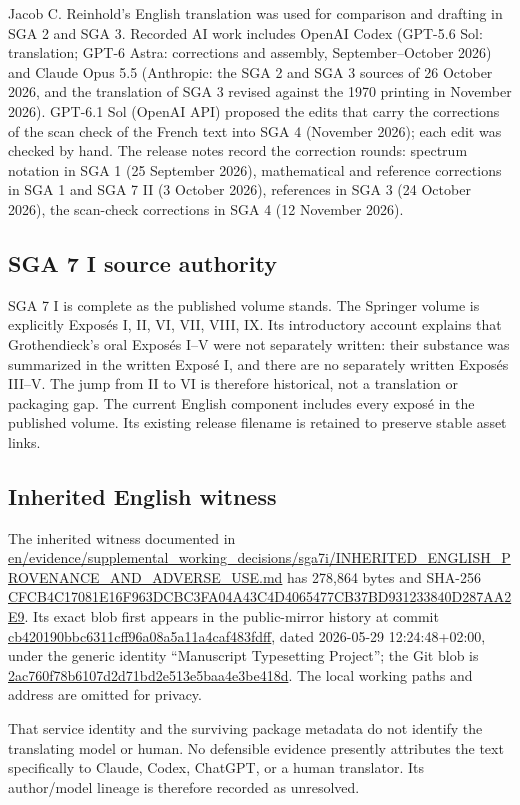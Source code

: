 Jacob C. Reinhold's English translation was used for comparison and drafting in SGA 2 and SGA 3. Recorded AI work includes OpenAI Codex (GPT-5.6 Sol: translation; GPT-6 Astra: corrections and assembly, September–October 2026) and Claude Opus 5.5 (Anthropic: the SGA 2 and SGA 3 sources of 26 October 2026, and the translation of SGA 3 revised against the 1970 printing in November 2026). GPT-6.1 Sol (OpenAI API) proposed the edits that carry the corrections of the scan check of the French text into SGA 4 (November 2026); each edit was checked by hand. The release notes record the correction rounds: spectrum notation in SGA 1 (25 September 2026), mathematical and reference corrections in SGA 1 and SGA 7 II (3 October 2026), references in SGA 3 (24 October 2026), the scan-check corrections in SGA 4 (12 November 2026).


\subsection*{SGA 7 I source authority}

SGA 7 I is complete as the published volume stands. The Springer volume is explicitly Exposés I, II, VI, VII, VIII, IX. Its introductory account explains that Grothendieck's oral Exposés I–V were not separately written: their substance was summarized in the written Exposé I, and there are no separately written Exposés III–V. The jump from II to VI is therefore historical, not a translation or packaging gap. The current English component includes every exposé in the published volume. Its existing release filename is retained to preserve stable asset links.


\subsection*{Inherited English witness}

The inherited witness documented in \url{en/evidence/supplemental_working_decisions/sga7i/INHERITED_ENGLISH_PROVENANCE_AND_ADVERSE_USE.md} has 278,864 bytes and SHA-256 \url{CFCB4C17081E16F963DCBC3FA04A43C4D4065477CB37BD931233840D287AA2E9}. Its exact blob first appears in the public-mirror history at commit \url{cb420190bbc6311cff96a08a5a11a4caf483fdff}, dated 2026-05-29 12:24:48+02:00, under the generic identity “Manuscript Typesetting Project”; the Git blob is \url{2ac760f78b6107d2d71bd2e513e5baa4e3be418d}. The local working paths and address are omitted for privacy.

That service identity and the surviving package metadata do not identify the translating model or human. No defensible evidence presently attributes the text specifically to Claude, Codex, ChatGPT, or a human translator. Its author/model lineage is therefore recorded as unresolved.

